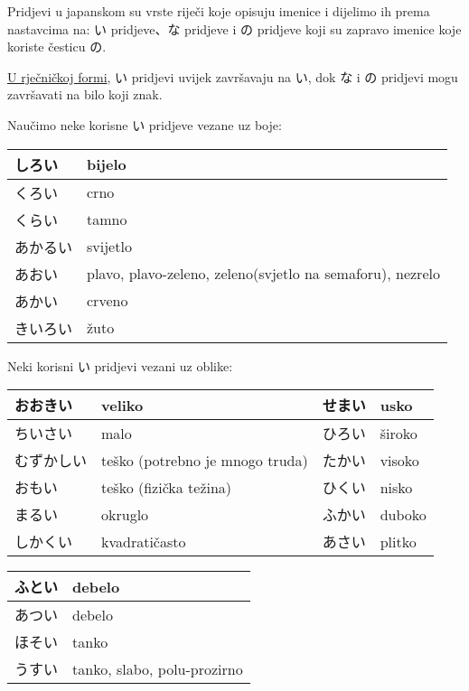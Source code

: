 
\author{Tomislav Mamić, Željka Ludošan}


	
	
	Pridjevi u japanskom su vrste riječi koje opisuju imenice i dijelimo ih prema nastavcima na: い pridjeve、な pridjeve i の pridjeve koji su zapravo imenice koje koriste česticu の.
	
\underline{U rječničkoj formi}, い pridjevi uvijek završavaju na い, dok な i の pridjevi mogu završavati na bilo koji znak.



Naučimo neke korisne い pridjeve vezane uz boje:

	\vspace{10pt}
	\begin{tabular}{|l|l|}
		\hline
		しろい&bijelo\\\hline
		くろい&crno\\\hline
		くらい&tamno\\\hline
		あかるい&svijetlo\\\hline
		あおい&plavo, plavo-zeleno, zeleno(svjetlo na semaforu), nezrelo\\\hline
		あかい&crveno\\\hline
		きいろい&žuto\\\hline
	\end{tabular}
	
\vspace{10pt}
Neki korisni い pridjevi vezani uz oblike:
	
	\vspace{10pt}
	\begin{tabular}{|l|l|l|l|}
		\hline
		おおきい&veliko&せまい&usko\\\hline
		ちいさい&malo&ひろい&široko\\\hline
		むずかしい&teško (potrebno je mnogo truda)&たかい&visoko\\\hline
		おもい&teško (fizička težina)&ひくい&nisko\\\hline
		まるい&okruglo&ふかい&duboko\\\hline
		しかくい&kvadratičasto&あさい&plitko\\\hline
	\end{tabular}
	
	\vspace{10pt}
	\begin{tabular}{|l|l|}
		\hline
		ふとい&debelo\\\hline
		あつい&debelo\\\hline
		ほそい&tanko\\\hline
		うすい&tanko, slabo, polu-prozirno\\\hline
	\end{tabular}
	
